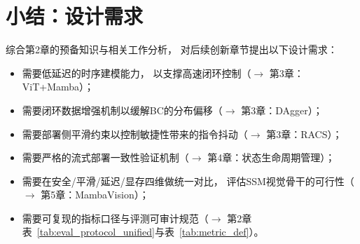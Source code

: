 \section{小结：设计需求}

综合第2章的预备知识与相关工作分析，
对后续创新章节提出以下设计需求：

\begin{itemize}
  \item 需要低延迟的时序建模能力，
    以支撑高速闭环控制（$\rightarrow$ 第3章：ViT+Mamba）；
     \item 需要闭环数据增强机制以缓解BC的分布偏移（$\rightarrow$ 第3章：DAgger）；
     \item 需要部署侧平滑约束以控制敏捷性带来的指令抖动（$\rightarrow$ 第3章：RACS）；
     \item 需要严格的流式部署一致性验证机制（$\rightarrow$ 第4章：状态生命周期管理）；
     \item 需要在安全/平滑/延迟/显存四维做统一对比，
    评估SSM视觉骨干的可行性（$\rightarrow$ 第5章：MambaVision）；
 \item 需要可复现的指标口径与评测可审计规范（$\rightarrow$ 第2章表~\ref{tab:eval_protocol_unified}与表~\ref{tab:metric_def}）。
     \end{itemize}
